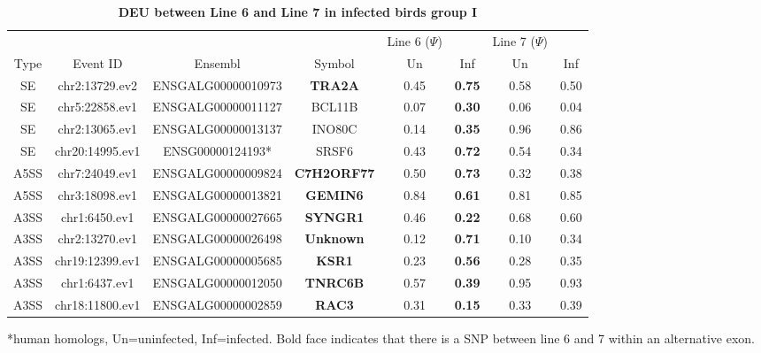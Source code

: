 \documentclass[10pt]{article}
\begin{document}
\begin{table}[!ht]
\caption{
\bf{DEU between Line 6 and Line 7 in infected birds group I}}
\begin{tabular}{cccccccc}
\hline
& & & & Line 6 ($\Psi$) & & Line 7 ($\Psi$) & \\
Type & Event ID & Ensembl & Symbol  & Un & Inf & Un & Inf \\
\hline
SE & chr2:13729.ev2 & ENSGALG00000010973 & \textbf{TRA2A} & 0.45 & \textbf{0.75} & 0.58 & 0.50 \\
SE & chr5:22858.ev1 & ENSGALG00000011127 & BCL11B & 0.07 & \textbf{0.30} & 0.06 & 0.04 \\
SE & chr2:13065.ev1 & ENSGALG00000013137 & INO80C & 0.14 & \textbf{0.35} & 0.96 & 0.86 \\
SE & chr20:14995.ev1 & ENSG00000124193* & SRSF6 & 0.43 & \textbf{0.72} & 0.54 & 0.34 \\
A5SS & chr7:24049.ev1 & ENSGALG00000009824 & \textbf{C7H2ORF77} & 0.50 & \textbf{0.73} & 0.32 & 0.38 \\
A5SS & chr3:18098.ev1 & ENSGALG00000013821 & \textbf{GEMIN6} & 0.84 & \textbf{0.61} & 0.81 & 0.85 \\
A3SS & chr1:6450.ev1 & ENSGALG00000027665 & \textbf{SYNGR1} & 0.46 & \textbf{0.22} & 0.68 & 0.60 \\
A3SS & chr2:13270.ev1 & ENSGALG00000026498 & \textbf{Unknown} & 0.12 & \textbf{0.71} & 0.10 & 0.34 \\
A3SS & chr19:12399.ev1 & ENSGALG00000005685 & \textbf{KSR1} & 0.23 & \textbf{0.56} & 0.28 & 0.35 \\
A3SS & chr1:6437.ev1 & ENSGALG00000012050 & \textbf{TNRC6B} & 0.57 & \textbf{0.39} & 0.95 & 0.93 \\
A3SS & chr18:11800.ev1 & ENSGALG00000002859 & \textbf{RAC3} & 0.31 & \textbf{0.15} & 0.33 & 0.39 \\
\hline
\end{tabular}
\begin{flushleft}
    *human homologs, Un=uninfected, Inf=infected.
    Bold face indicates that there is a SNP between line 6 and 7 within an alternative exon.
\end{flushleft}
\label{tab:line67i_diff_line67u_one}
\end{table}
\end{document}

